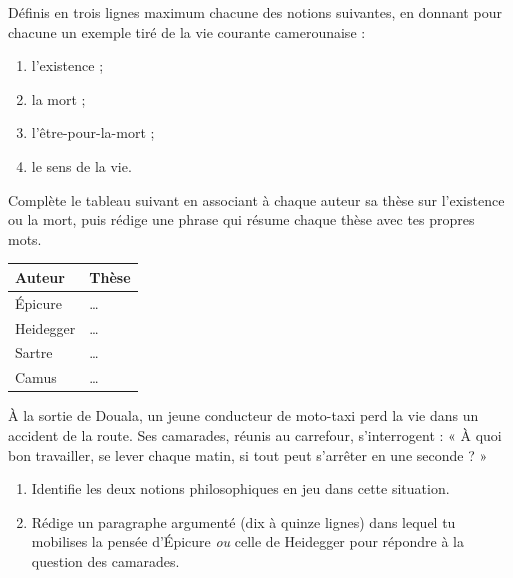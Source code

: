 \documentclass[11pt]{article}
\newcounter{popsec}
\newcounter{popsub}
\newcommand{\courssub}[1]{%
  \stepcounter{popsub}%
  \par\vspace{9pt}\noindent{\popxbold\fontsize{11.5}{13}\selectfont\color{popink}{\color{poporange}\thepopsec.\thepopsub}\hspace{6pt}#1}\par\nopagebreak\vspace{4pt}
}
\begin{document}
\begin{exercice}[Définitions]
Définis en trois lignes maximum chacune des notions suivantes, en donnant pour chacune un exemple tiré de la vie courante camerounaise :
\begin{enumerate}
\item l'existence ;
\item la mort ;
\item l'être-pour-la-mort ;
\item le sens de la vie.
\end{enumerate}
\end{exercice}

\begin{exercice}
Complète le tableau suivant en associant à chaque auteur sa thèse sur l'existence ou la mort, puis rédige une phrase qui résume chaque thèse avec tes propres mots.
\begin{center}
\begin{tabularx}{\linewidth}{|l|X|}
\hline
\rowcolor{popblueL} \textbf{Auteur} & \textbf{Thèse} \\
\hline
Épicure & \ldots \\
\hline
Heidegger & \ldots \\
\hline
Sartre & \ldots \\
\hline
Camus & \ldots \\
\hline
\end{tabularx}
\end{center}
\end{exercice}

\courssub{Je m'entraîne}

\begin{exercice}[L'accident de la N3]
À la sortie de Douala, un jeune conducteur de moto-taxi perd la vie dans un accident de la route. Ses camarades, réunis au carrefour, s'interrogent : « À quoi bon travailler, se lever chaque matin, si tout peut s'arrêter en une seconde ? »
\begin{enumerate}
\item Identifie les deux notions philosophiques en jeu dans cette situation.
\item Rédige un paragraphe argumenté (dix à quinze lignes) dans lequel tu mobilises la pensée d'Épicure \emph{ou} celle de Heidegger pour répondre à la question des camarades.
\end{enumerate}
\end{exercice}
\end{document}
